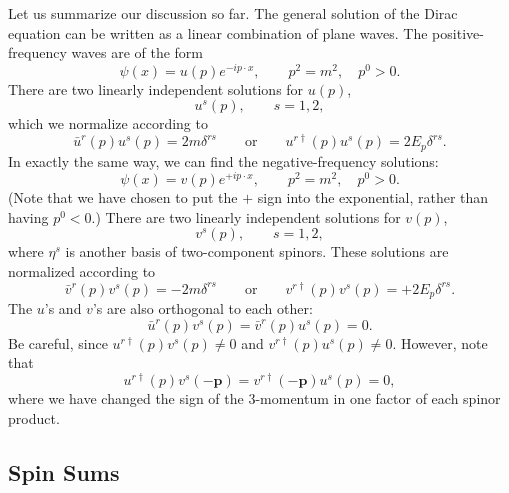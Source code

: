 Let us summarize our discussion so far.  The general solution of the Dirac
equation can be written as a linear combination of plane waves.  The
positive-frequency waves are of the form
\begin{equation}
  \psi(x) = u(p)e^{-ip\cdot x},\qquad p^2 = m^2,\quad p^0>0 .
  \label{eq:3.60}
\end{equation}
There are two linearly independent solutions for $u(p)$,
\begin{equation}
  u^s(p),\qquad s = 1, 2,
  \label{eq:3.61}
\end{equation}
which we normalize according to
\begin{equation}
  \bar{u}^r(p)u^s(p) = 2m\delta^{rs}
  \qquad\text{or}\qquad
  u^{r\dagger}(p)u^s(p) = 2E_p\delta^{rs}.
  \label{eq:3.62}
\end{equation}
In exactly the same way, we can find the negative-frequency solutions:
\begin{equation}
  \psi(x) = v(p)e^{+ip\cdot x},\qquad p^2 = m^2,\quad p^0>0 .
  \label{eq:3.63}
\end{equation}
(Note that we have chosen to put the $+$ sign into the exponential, rather
than having $p^0<0$.)  There are two linearly independent solutions for
$v(p)$,
\begin{equation}
  v^s(p),\qquad s = 1, 2,
  \label{eq:3.64}
\end{equation}
where $\eta^s$ is another basis of two-component spinors.  These solutions
are normalized according to
\begin{equation}
  \bar{v}^r(p)v^s(p) = -2m\delta^{rs}
  \qquad\text{or}\qquad
  v^{r\dagger}(p)v^s(p) = +2E_p\delta^{rs}.
  \label{eq:3.65}
\end{equation}
The $u$'s and $v$'s are also orthogonal to each other:
\begin{equation}
  \bar{u}^r(p)v^s(p) = \bar{v}^r(p)u^s(p) = 0 .
  \label{eq:3.66}
\end{equation}
Be careful, since $u^{r\dagger}(p)v^s(p)\neq 0$ and
$v^{r\dagger}(p)u^s(p)\neq 0$.  However, note that
\begin{equation}
  u^{r\dagger}(p)v^s(-\mathbf{p}) =
  v^{r\dagger}(-\mathbf{p})u^s(p) = 0 ,
  \label{eq:3.67}
\end{equation}
where we have changed the sign of the 3-momentum in one factor of each spinor
product.

\subsection{Spin Sums}

